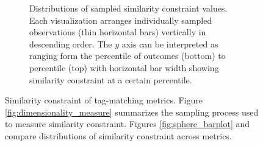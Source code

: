 \begin{figure}
\begin{center}
\begin{minipage}{\linewidth}
\begin{subfigure}[b]{\linewidth}
\begin{minipage}{0.8\textwidth}
\caption{
Distributions of sampled similarity constraint values.
Each visualization arranges individually sampled observations (thin horizontal bars) vertically in descending order.
The $y$ axis can be interpreted as ranging form the  percentile of outcomes (bottom) to  percentile (top) with horizontal bar width showing similarity constraint at a certain percentile.
}
\label{fig:sphere_distnplot}
\end{minipage}
\end{subfigure}
\end{minipage}

\caption{
Similarity constraint of tag-matching metrics.
Figure \ref{fig:dimensionality_measure} summarizes the sampling process used to measure similarity constraint.
Figures \ref{fig:sphere_barplot} and  \label{fig:sphere_distnplot} compare distributions of similarity constraint across metrics.
}
\label{fig:sphere}

\end{center}
\end{figure}
